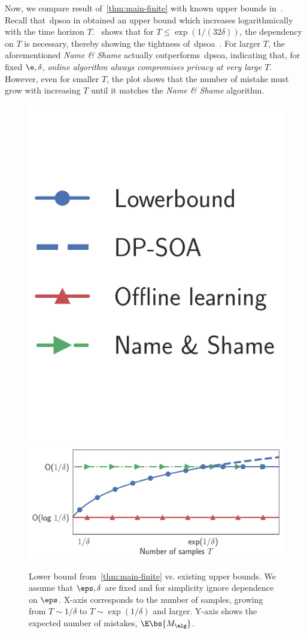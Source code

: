 Now, we compare result of~\cref{thm:main-finite} with known upper bounds in~. Recall that~\Gls{dpsoa} in \citet{golowich2021littlestone} obtained an upper bound which increases logarithmically with the time horizon \(T\).~ shows that for \(T \leq \exp(1 / (32\delta))\), the dependency on \(T\) is necessary, thereby showing the tightness of~\Gls{dpsoa}~\citep{golowich2021littlestone}. For  larger \(T\), the aforementioned \emph{Name \& Shame} actually outperforms~\Gls{dpsoa}, indicating that, for fixed \(\e, \delta\), \emph{online algorithm always compromises privacy at very large \(T\)}. However, even for smaller \(T\), the plot shows that the number of mistake must grow with increasing \(T\) until it matches the \emph{Name \& Shame} algorithm.

\begin{figure}[t]\centering\vspace{-20pt}
\includegraphics[width=0.2\linewidth]{chapters/dp/content/figures/legend.pdf}\quad\quad
\includegraphics[width=0.6\linewidth]{chapters/dp/content/figures/lb_comp_markers_no_leg.pdf}
\caption{\small Lower bound from~\cref{thm:main-finite} vs. existing upper bounds. We assume that \(\eps, \delta\) are fixed and for simplicity ignore dependence on \(\eps\). X-axis corresponds to the number of samples, growing from \(T \sim 1/\delta\) to \(T \sim \exp(1/\delta)\) and larger. Y-axis shows the expected number of mistakes, \(\E \bs{M_{\alg}}\).\vspace{-15pt}}
\label{fig:lower-bound}
\end{figure}

